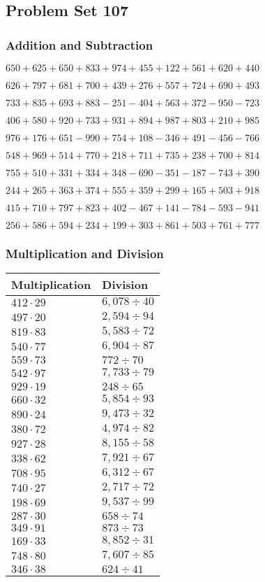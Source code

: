 \hypertarget{problem-set-107}{%
\subsection{Problem Set 107}\label{problem-set-107}}

\hypertarget{addition-and-subtraction}{%
\subsubsection{Addition and
Subtraction}\label{addition-and-subtraction}}

\(650 +625 +650 +833 +974 +455 +122 +561 +620 +440\)

\(626 +797 +681 +700 +439 +276 +557 +724 +690 +493\)

\(733 +835 +693 +883 - 251 - 404 +563 +372 - 950 - 723\)

\(406 +580 +920 +733 +931 +894 +987 +803 +210 +985\)

\(976 +176 +651 - 990 +754 +108 - 346 +491 - 456 - 766\)

\(548 +969 +514 +770 +218 +711 +735 +238 +700 +814\)

\(755 +510 +331 +334 +348 - 690 - 351 - 187 - 743 +390\)

\(244 +265 +363 +374 +555 +359 +299 +165 +503 +918\)

\(415 +710 +797 +823 +402 - 467 +141 - 784 - 593 - 941\)

\(256 +586 +594 +234 +199 +303 +861 +503 +761 +777\)

\hypertarget{multiplication-and-division}{%
\subsubsection{Multiplication and
Division}\label{multiplication-and-division}}

\begin{longtable}[]{@{}ll@{}}
\toprule
Multiplication & Division\tabularnewline
\midrule
\endhead
\(412 \cdot 29\) & \(6,078÷40\)\tabularnewline
\(497 \cdot 20\) & \(2,594÷94\)\tabularnewline
\(819 \cdot 83\) & \(5,583÷72\)\tabularnewline
\(540 \cdot 77\) & \(6,904÷87\)\tabularnewline
\(559 \cdot 73\) & \(772÷70\)\tabularnewline
\(542 \cdot 97\) & \(7,733÷79\)\tabularnewline
\(929 \cdot 19\) & \(248÷65\)\tabularnewline
\(660 \cdot 32\) & \(5,854÷93\)\tabularnewline
\(890 \cdot 24\) & \(9,473÷32\)\tabularnewline
\(380 \cdot 72\) & \(4,974÷82\)\tabularnewline
\(927 \cdot 28\) & \(8,155÷58\)\tabularnewline
\(338 \cdot 62\) & \(7,921÷67\)\tabularnewline
\(708 \cdot 95\) & \(6,312÷67\)\tabularnewline
\(740 \cdot 27\) & \(2,717÷72\)\tabularnewline
\(198 \cdot 69\) & \(9,537÷99\)\tabularnewline
\(287 \cdot 30\) & \(658÷74\)\tabularnewline
\(349 \cdot 91\) & \(873÷73\)\tabularnewline
\(169 \cdot 33\) & \(8,852÷31\)\tabularnewline
\(748 \cdot 80\) & \(7,607÷85\)\tabularnewline
\(346 \cdot 38\) & \(624÷41\)\tabularnewline
\bottomrule
\end{longtable}
